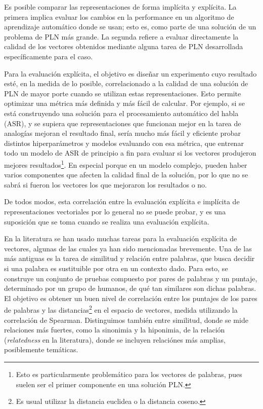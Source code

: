 Es posible comparar las representaciones de forma implícita y explícita. La primera implica evaluar
los cambios en la performance en un algoritmo de aprendizaje automático donde se usan; esto es, como
parte de una solución de un problema de PLN más grande. La segunda refiere a evaluar directamente la
calidad de los vectores obtenidos mediante alguna tarea de PLN desarrollada específicamente para el
caso.

Para la evaluación explícita, el objetivo es diseñar un experimento cuyo resultado esté, en la
medida de lo posible, correlacionado a la calidad de una solución de PLN de mayor porte cuando se
utilizan estas representaciones. Esto permite optimizar una métrica más definida y más fácil de
calcular. Por ejemplo, si se está construyendo una solución para el procesamiento automático del
habla (ASR), y se supiera que representaciones que funcionan mejor en la tarea de analogías mejoran
el resultado final, sería mucho más fácil y eficiente probar distintos hiperparámetros y modelos
evaluando con esa métrica, que entrenar todo un modelo de ASR de principio a fin para evaluar si los
vectores produjeron mejores resultados\footnote{Esto es particularmente problemático para los
vectores de palabras, pues suelen ser el primer componente en una solución PLN.}. En especial porque
en un modelo complejo, pueden haber varios componentes que afecten la calidad final de la solución,
por lo que no se sabrá si fueron los vectores los que mejoraron los resultados o no.

De todos modos, esta correlación entre la evaluación explícita e implícita de representaciones
vectoriales por lo general no se puede probar, y es una suposición que se toma cuando se realiza una
evaluación explícita.


En la literatura se han usado muchas tareas para la evaluación explícita de vectores, algunas de las
cuales ya han sido mencionadas brevemente. Una de las más antiguas es la tarea de similitud y
relación entre palabras, que busca decidir si una palabra es sustituible por otra en un contexto
dado. Para esto, se construye un conjunto de pruebas compuesto por pares de palabras y un puntaje,
determinado por un grupo de humanos, de qué tan similares son dichas palabras. El objetivo es
obtener un buen nivel de correlación entre los puntajes de los pares de palabras y las
distancias\footnote{Es usual utilizar la distancia euclidea o la distancia coseno.} en el espacio de
vectores, medida utilizando la correlación de Spearman. Distinguimos también entre similitud, donde
se mide relaciones más fuertes, como la sinonimia y la hiponimia, de la relación
(\textit{relatedness} en la literatura), donde se incluyen relaciónes más amplias, posiblemente
temáticas.


